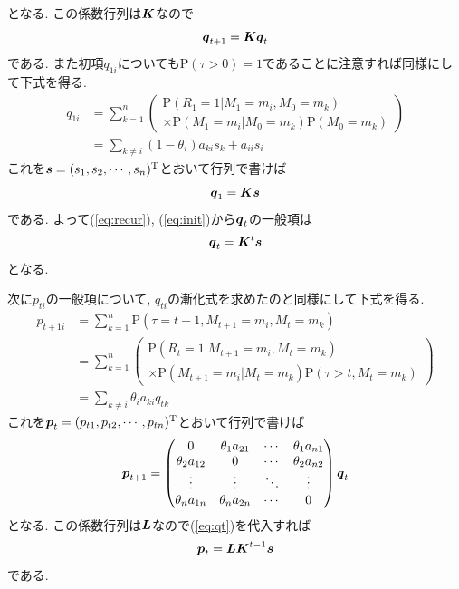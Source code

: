 となる. この係数行列は$ \boldsymbol{K} $なので
\begin{equation} \label{eq:recur}
    \boldsymbol{q}_{t + 1} = \boldsymbol{K} \boldsymbol{q}_t
\end{equation}
である. また初項$ q_{1 i} $についても$ \mathrm{P}(\tau > 0) = 1 $であることに注意すれば同様にして下式を得る. 
\begin{align}
    q_{1 i} & =\sum_{k=1}^n \left(
        \begin{array}{l}
            \mathrm{P}(R_1 = 1 | M_1 = m_i , M_0 = m_k) \\
            \times \mathrm{P}(M_1 = m_i | M_0 = m_k) \mathrm{P}(M_0 = m_k)
        \end{array}
    \right) \\
    & =\sum_{k \ne i} (1 - \theta_i) a_{k i} s_k + a_{i i} s_i \label{eq:q1i}
\end{align}
これを$ \boldsymbol{s} = (s_1 , s_2 , \cdots , s_n)^\mathrm{T} $とおいて行列で書けば
\begin{equation} \label{eq:init}
    \boldsymbol{q}_1 = \boldsymbol{K} \boldsymbol{s}
\end{equation}
である. よって(\ref{eq:recur}), (\ref{eq:init})から$ \boldsymbol{q}_t $の一般項は
\begin{equation} \label{eq:qt}
    \boldsymbol{q}_t = \boldsymbol{K}^t \boldsymbol{s}
\end{equation}
となる. 

次に$ p_{t i} $の一般項について, $ q_{t i} $の漸化式を求めたのと同様にして下式を得る. 
\begin{align}
    p_{t+1 i} & =\sum_{k=1}^n \mathrm{P}(\tau = t + 1 , M_{t+1} = m_i , M_t = m_k) \\
    & =\sum_{k=1}^n \left(
        \begin{array}{l}
            \mathrm{P}(R_t=1 | M_{t+1}=m_i , M_t=m_k) \\
            \times \mathrm{P}(M_{t+1}=m_i | M_t=m_k) \mathrm{P}(\tau>t , M_t=m_k)
        \end{array}
    \right) \\
    & =\sum_{k \ne i} \theta_i a_{k i} q_{t k} \label{eq:pti_rec}
\end{align}
これを$ \boldsymbol{p}_t = (p_{t 1} , p_{t 2} , \cdots , p_{t n})^\mathrm{T} $とおいて行列で書けば
\begin{equation}
    \boldsymbol{p}_{t + 1} = 
    \begin{pmatrix}
        0 & \theta_1 a_{2 1} & \cdots & \theta_1 a_{n 1} \\
        \theta_2 a_{1 2} & 0 & \cdots & \theta_2 a_{n 2} \\
        \vdots & \vdots & \ddots & \vdots \\
        \theta_n a_{1 n} & \theta_n a_{2 n} & \cdots & 0 \\
    \end{pmatrix}
    \boldsymbol{q}_t
\end{equation}
となる. この係数行列は$ \boldsymbol{L} $なので(\ref{eq:qt})を代入すれば
\begin{equation} \label{eq:pt}
    \boldsymbol{p}_t = \boldsymbol{L} \boldsymbol{K}^{t - 1} \boldsymbol{s}
\end{equation}
である. 

